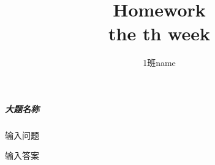 \documentclass[UTF8]{ctexart}
\title{\textbf{Homework}\\ \large the th week}
\author{\slshape物理1班\quad name \quad 20172801}
\date{}
\begin{document}
\maketitle

\subparagraph{大题名称}

    \begin{Question}
        \item 输入问题

\begin{Answer}
    \begin{Solve}[Solve:]
        输入答案
    \end{Solve}
\end{Answer}

    \end{Question}
\end{document}
